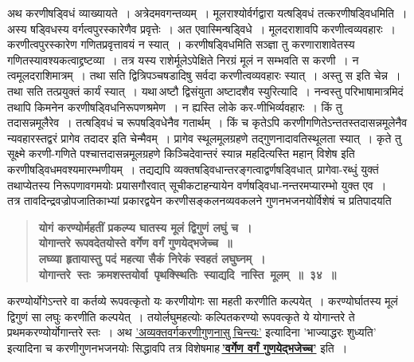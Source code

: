 \documentclass[11pt, openany]{book}
\begin{document}
\begin{sloppypar}
अथ करणीषड्विधं व्याख्यायते~। अत्रेदमवगन्तव्यम्~। मूलराश्योर्वर्गद्वारा यत्षड्विधं तत्करणीषड्विधमिति~। अस्य षड्विधस्य वर्गत्वपुरस्कारेणैव प्रवृत्तेः~। अत एवास्मिन्षड्विधे~। मूलदराशावपि करणीत्वव्यवहारः~। करणीत्वपुरस्कारेण गणितप्रवृत्तावयं न स्यात्~। करणीषड्विधमिति सञ्ज्ञा तु करणाराशावेतस्य गणितस्यावश्यकत्वाद्द्रष्टव्या~। तत्र यस्य राशेर्मूलेऽपेक्षिते निरग्रं मूलं न सम्भवति स करणी~। न त्वमूलदराशिमात्रम्~। तथा सति द्वित्रिपञ्चषडादिषु सर्वदा करणीत्वव्यवहारः स्यात्~। अस्तु स इति चेन्न~। तथा सति तत्प्रयुक्तं कार्यं स्यात्~। यथा\textendash \,अष्टौ द्विसंयुता अष्टादशैव स्युरित्यादि~। नन्वस्तु परिभाषामात्रमिदं तथापि किमनेन करणीषड्विधनिरूपणश्रमेण~। न ह्यस्ति लोके कर-णीभिर्व्यवहारः~। किं तु तदासन्नमूलैरेव~। तत्षड्विधं च रूपषड्विधेनैव गतार्थम्~। किं च कृतेऽपि करणीगणितेऽन्ततस्तदासन्नमूलेनैव न्यवहारस्तद्वरं प्रागेव तदादर इति चेन्मैवम्~। प्रागेव स्थूलमूलग्रहणे तद्गुणनादावतिस्थूलता स्यात्~। कृते तु सूक्ष्मे करणी-गणिते पश्चात्तदासन्नमूलग्रहणे किञ्चिदेवान्तरं स्यान्न महदित्यस्ति महान् विशेष इति करणीषड्विधमवश्यमारम्भणीयम्~। तद्यद्यपि व्यक्तषड्विधान्तरङ्गत्वाद्वर्णषड्विधात्~प्रागेवा-रब्धुं युक्तं तथाप्येतस्य निरूपणावगमयोः प्रयासगौरवात् सूचीकटाहन्यायेन वर्णषड्विधा-नन्तरमप्यारम्भो युक्त एव~।\\

{\small तत्र तावदिन्द्रवज्रोपजातिकाभ्यां प्रकारद्वयेन करणीसङ्कलनव्यवकलने गुणनभजनयोर्विशेषं च प्रतिपादयति\textendash }

 \label{4.34}
\begin{quote}
{\large \textbf{{\color{purple}योगं करण्योर्महतीं प्रकल्प्य घातस्य मूलं द्विगुणं लघुं च~।\\
योगान्तरे रूपवदेतयोस्ते वर्गेण वर्गं गुणयेद्भजेच्च~॥\\
लघ्व्या हृतायास्तु पदं महत्या सैकं निरेकं स्वहतं लघुघ्नम्~।\\
योगान्तरे~स्तः~क्रमशस्तयोर्वा~पृथक्स्थितिः~स्याद्यदि~नास्ति~मूलम्~॥~३४~॥}}}
\end{quote}

करण्योर्योगेऽन्तरे वा कर्तव्ये रूपवत्कृतो यः करणीयोगः सा महती करणीति कल्पयेत्~। करण्योर्घातस्य मूलं द्विगुणं सा लघुः करणीति कल्पयेत्~। तयोर्लघुमहत्योः कल्पितकरण्यो रूपवत्कृते ये योगान्तरे ते प्रथमकरण्योर्योगान्तरे स्तः~। अथ \hyperref[3.27]{'अव्यक्तवर्गकरणीगुणनासु चिन्त्यः'} इत्यादिना {\color{violet}'भाज्याद्धरः शुध्यति'} इत्यादिना च करणीगुणनभजनयोः सिद्धावपि तत्र विशेषमाह\textendash \,\hyperref[4.34]{\textbf{'वर्गेण वर्गं गुणयेद्भजेच्च'}} इति~।
\end{sloppypar}
\end{document}
